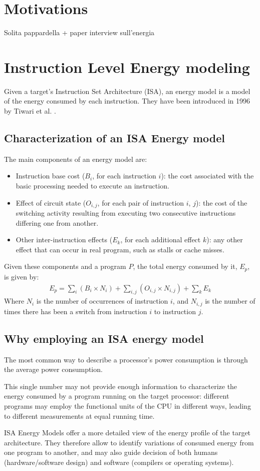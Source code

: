 \section{Motivations}
Solita pappardella + paper interview sull'energia

\section{Instruction Level Energy modeling}
Given a target's Instruction Set Architecture (ISA), an energy model is a model of the energy consumed by each instruction.
They have been introduced in 1996 by Tiwari et al. \cite{tiwari}. 
\subsection{Characterization of an ISA Energy model}
The main components of an energy model are:
\begin{itemize}
\item Instruction base cost ($B_{i}$, for each instruction $i$): the cost associated with the basic processing needed to execute an instruction. 
\item Effect of circuit state ($O_{i,j}$, for each pair of instruction $i$, $j$): the cost of the switching activity resulting from executing two consecutive instructions differing one from another.
\item Other inter-instruction effects ($E_{k}$, for each additional effect $k$): any other effect that can occur in real program, such as stalls or cache misses.
\end{itemize}
\par Given these components and a program $P$, the total energy consumed by it, $E_{p}$, is given by:
\begin{gather*}
E_{p} = \sum_{i} (B_{i} \times N_{i}) + \sum_{i,j} (O_{i,j} \times N_{i,j}) + \sum_{k} E_{k}
\end{gather*}
Where $N_{i}$ is the number of occurrences of instruction $i$, and $N_{i,j}$ is the number of times there has been a switch from instruction $i$ to instruction $j$.

\subsection{Why employing an ISA energy model}
The most common way to describe a processor's power consumption is through the average power consumption. \par
This single number may not provide enough information to characterize the energy consumed by a program running on the target processor: different programs may employ the functional units of the CPU in different ways, leading to different measurements at equal running time. \par
ISA Energy Models offer a more detailed view of the energy profile of the target architecture. They therefore allow to identify variations of consumed energy from one program to another, and may also guide decision of both humans (hardware/software design) and software (compilers or operating systems).

